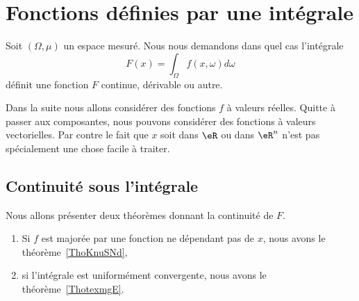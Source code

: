 \section{Fonctions définies par une intégrale}
\label{SecCHwnBDj}

Soit \( (\Omega,\mu)\) un espace mesuré. Nous nous demandons dans quel cas l'intégrale
\begin{equation}
	F(x)=\int_{\Omega}f(x,\omega)d\omega
\end{equation}
définit une fonction \( F\) continue, dérivable ou autre.

Dans la suite nous allons considérer des fonctions \( f\) à valeurs réelles. Quitte à passer aux composantes, nous pouvons considérer des fonctions à valeurs vectorielles. Par contre le fait que \( x\) soit dans \( \eR\) ou dans \( \eR^n\) n'est pas spécialement une chose facile à traiter.

\subsection{Continuité sous l'intégrale}

Nous allons présenter deux théorèmes donnant la continuité de \( F\).
\begin{enumerate}
	\item
	      Si \( f\) est majorée par une fonction ne dépendant pas de \( x\), nous avons le théorème~\ref{ThoKnuSNd},
	\item
	      si l'intégrale est uniformément convergente, nous avons le théorème~\ref{ThotexmgE}.
\end{enumerate}

